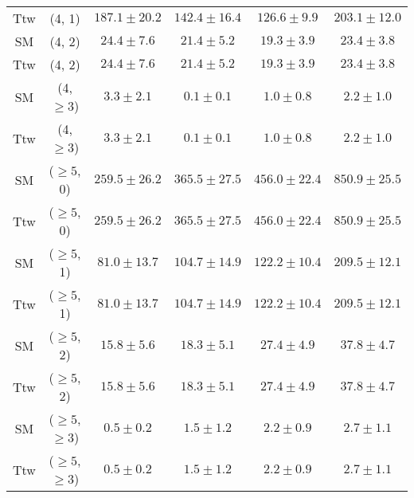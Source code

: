 \begin{table}[h!]
{\begin{tabular}{cccccc}
	Ttw & (4, 1) & $187.1\pm 20.2$ & $142.4\pm 16.4$ & $126.6\pm 9.9$ & $203.1\pm 12.0$ \\[0.5ex] 
	SM & (4, 2) & $24.4\pm 7.6$ & $21.4\pm 5.2$ & $19.3\pm 3.9$ & $23.4\pm 3.8$ \\[0.5ex] 
	Ttw & (4, 2) & $24.4\pm 7.6$ & $21.4\pm 5.2$ & $19.3\pm 3.9$ & $23.4\pm 3.8$ \\[0.5ex] 
	SM & (4, $\ge3$) & $3.3\pm 2.1$ & $0.1\pm 0.1$ & $1.0\pm 0.8$ & $2.2\pm 1.0$ \\[0.5ex] 
	Ttw & (4, $\ge3$) & $3.3\pm 2.1$ & $0.1\pm 0.1$ & $1.0\pm 0.8$ & $2.2\pm 1.0$ \\[0.5ex] 
	SM & ($\ge5$, 0) & $259.5\pm 26.2$ & $365.5\pm 27.5$ & $456.0\pm 22.4$ & $850.9\pm 25.5$ \\[0.5ex] 
	Ttw & ($\ge5$, 0) & $259.5\pm 26.2$ & $365.5\pm 27.5$ & $456.0\pm 22.4$ & $850.9\pm 25.5$ \\[0.5ex] 
	SM & ($\ge5$, 1) & $81.0\pm 13.7$ & $104.7\pm 14.9$ & $122.2\pm 10.4$ & $209.5\pm 12.1$ \\[0.5ex] 
	Ttw & ($\ge5$, 1) & $81.0\pm 13.7$ & $104.7\pm 14.9$ & $122.2\pm 10.4$ & $209.5\pm 12.1$ \\[0.5ex] 
	SM & ($\ge5$, 2) & $15.8\pm 5.6$ & $18.3\pm 5.1$ & $27.4\pm 4.9$ & $37.8\pm 4.7$ \\[0.5ex] 
	Ttw & ($\ge5$, 2) & $15.8\pm 5.6$ & $18.3\pm 5.1$ & $27.4\pm 4.9$ & $37.8\pm 4.7$ \\[0.5ex] 
	SM & ($\ge5$, $\ge3$) & $0.5\pm 0.2$ & $1.5\pm 1.2$ & $2.2\pm 0.9$ & $2.7\pm 1.1$ \\[0.5ex] 
	Ttw & ($\ge5$, $\ge3$) & $0.5\pm 0.2$ & $1.5\pm 1.2$ & $2.2\pm 0.9$ & $2.7\pm 1.1$ \\[0.5ex] 
	\hline
	\hline
\end{tabular}}
\end{table}
